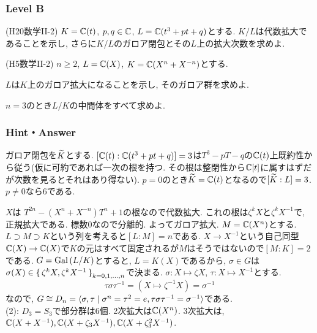 \subsubsection{Level B}


\begin{prob} (H20数学II-2)
$K=\mathbb{C}(t)$, $p,q\in \mathbb{C}$, $L=\mathbb{C}(t^3+pt+q)$とする. $K/L$は代数拡大であることを示し, さらに$K/L$のガロア閉包とその$L$上の拡大次数を求めよ.
\end{prob}



\begin{prob} (H5数学II-2)
$n\geq 2$, $L=\mathbb{C}(X)$, $K=\mathbb{C}(X^n + X^{-n})$とする.
\ben
\item $L$は$K$上のガロア拡大になることを示し, そのガロア群を求めよ.
\item $n=3$のとき$L/K$の中間体をすべて求めよ.
\een
\end{prob}



\subsubsection{Hint・Answer}
\begin{probans}
ガロア閉包を$\widetilde{K}$とする. $[\mathbb{C}(t):\mathbb{C}(t^3+pt+q)] = 3$は$T^3 - pT - q$の$\mathbb{C}(t)$上既約性から従う(仮に可約であれば一次の根を持つ. その根は整閉性から$\mathbb{C}[t]$に属すはずだが次数を見るとそれはあり得ない).
$p=0$のとき$\widetilde{K} = \mathbb{C}(t)$となるので$[\widetilde{K}:L] = 3$. $p\neq 0$なら6である.
\end{probans}

\begin{probans} $X$は
$T^{2n} -(X^n + X^{-n})T^n + 1$の根なので代数拡大. これの根は$\zeta^k X$と$\zeta^k X^{-1}$で, 正規拡大である. 標数0なので分離的. よってガロア拡大. $M=\mathbb{C}(X^n)$とする. $L\supset M \supset K$という列を考えると$[L:M] = n$である. $X\to X^{-1}$という自己同型$\mathbb{C}(X)\to \mathbb{C}(X)$で$K$の元はすべて固定されるが$M$はそうではないので$[M:K] = 2$である. $G = \operatorname{Gal}{(L/K)}$とすると, $L=K(X)$であるから, $\sigma\in G$は$\sigma(X)\in \set{\zeta^k X, \zeta^k X^{-1}}_{k=0,1,\dots, n}$で決まる.  $\sigma:X\mapsto \zeta X$, $\tau: X\mapsto X^{-1}$とする.
\[\tau \sigma \tau^{-1} = (X\mapsto \zeta^{-1}X) = \sigma^{-1}\]
なので, $G\cong D_{n} = \langle \sigma,\tau\mid \sigma^n = \tau^2 = e, \tau\sigma\tau^{-1} = \sigma^{-1} \rangle$である. \\
(2): $D_3 = S_3$で部分群は6個. 2次拡大は$\mathbb{C}(X^n)$. 3次拡大は, $\mathbb{C}(X+X^{-1}), \mathbb{C}(X+\zeta_3 X^{-1}), \mathbb{C}(X+\zeta_3^{2}X^{-1})$.
\end{probans}




\clearpage
